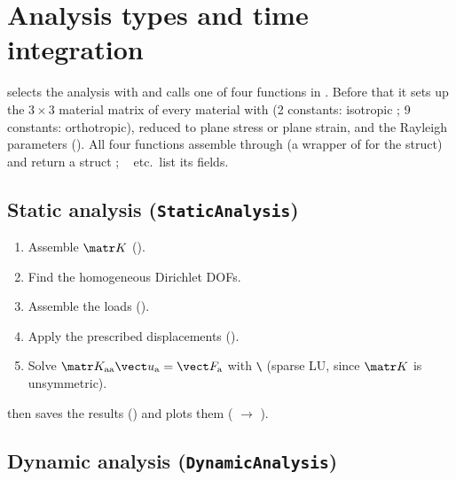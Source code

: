 \chapter{Analysis types and time integration}
\label{ch:analyses}

 selects the analysis with  and
calls one of four functions in . Before that it
sets up the $3\times3$ material matrix of every material with
 (2 constants: isotropic ; 9 constants:
orthotropic), reduced to plane stress or plane strain, and the Rayleigh parameters
(). All four functions assemble through
 (a wrapper of  for the 
struct) and return a struct ; ~ etc.\ list
its fields.

\section{Static analysis (\texttt{StaticAnalysis})}

\begin{enumerate}
  \item Assemble $\matr K$ ().
  \item Find the homogeneous Dirichlet DOFs.
  \item Assemble the loads ().
  \item Apply the prescribed displacements ().
  \item Solve $\matr K_\mathrm{aa}\vect u_\mathrm{a} = \vect F_\mathrm{a}$ with \texttt{\textbackslash}
    (sparse LU, since $\matr K$ is unsymmetric).
\end{enumerate}
 then saves the results () and plots them
( $\to$ ).

\section{Dynamic analysis (\texttt{DynamicAnalysis})}
\label{sec:dynamic}

